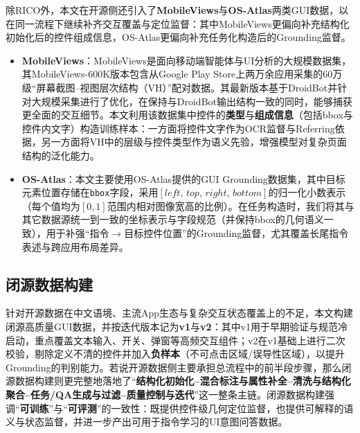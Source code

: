 除RICO外，本文在开源侧还引入了\textbf{MobileViews}\citep{gao2024mobileviews}与\textbf{OS-Atlas}\citep{wu2024osatlas}两类GUI数据，以在同一流程下继续补齐交互覆盖与定位监督：其中MobileViews更偏向补充结构化初始化后的控件组成信息，OS-Atlas更偏向补充任务化构造后的Grounding监督。
\begin{itemize}
  \item \textbf{MobileViews}：MobileViews是面向移动端智能体与UI分析的大规模数据集\citep{gao2024mobileviews}，其MobileViews-600K版本包含从Google Play Store上两万余应用采集的60万级“屏幕截图--视图层次结构（VH）”配对数据。其最新版本基于DroidBot并针对大规模采集进行了优化\citep{droidbot}，在保持与DroidBot输出结构一致的同时，能够捕获更全面的交互细节。本文利用该数据集中控件的\textbf{类型}与\textbf{组成信息}（包括bbox与控件内文字）构造训练样本：一方面将控件文字作为OCR监督与Referring依据，另一方面将VH中的层级与控件类型作为语义先验，增强模型对复杂页面结构的泛化能力。
  \item \textbf{OS-Atlas}：本文主要使用OS-Atlas提供的GUI Grounding数据集\citep{wu2024osatlas}，其中目标元素位置存储在\texttt{bbox}字段，采用$[left,\,top,\,right,\,bottom]$的归一化小数表示（每个值均为$[0,1]$范围内相对图像宽高的比例）。在任务构造时，我们将其与其它数据源统一到一致的坐标表示与字段规范（并保持bbox的几何语义一致），用于补强“指令$\rightarrow$目标控件位置”的Grounding监督，尤其覆盖长尾指令表述与跨应用布局差异。
\end{itemize}

\subsection{闭源数据构建}
针对开源数据在中文语境、主流App生态与复杂交互状态覆盖上的不足，本文构建闭源高质量GUI数据，并按迭代版本记为\textbf{v1}与\textbf{v2}：其中v1用于早期验证与规范冷启动，重点覆盖文本输入、开关、弹窗等高频交互组件；v2在v1基础上进行二次校验，剔除定义不清的控件并加入\textbf{负样本}（不可点击区域/误导性区域），以提升Grounding的判别能力。若说开源数据侧主要承担总流程中的前半段步骤，那么闭源数据构建则更完整地落地了“\textbf{结构化初始化--混合标注与属性补全--清洗与结构化聚合--任务/QA生成与过滤--质量控制与迭代}”这一整条主链。闭源数据构建强调“\textbf{可训练}”与“\textbf{可评测}”的一致性：既提供控件级几何定位监督，也提供可解释的语义与状态监督，并进一步产出可用于指令学习的UI意图问答数据。

